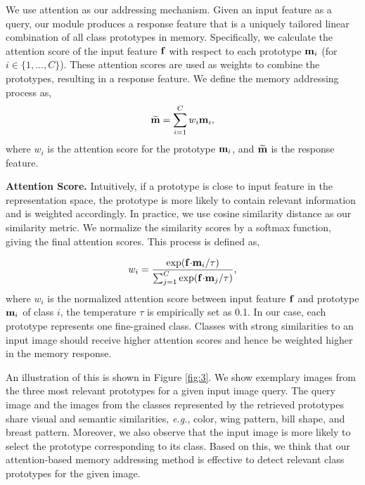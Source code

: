 \documentclass[journal]{IEEEtran}
\begin{document}
We use attention as our addressing mechanism. Given an input feature as a query, our module produces a response feature that is a uniquely tailored linear combination of all class prototypes in memory.  
Specifically, we calculate the attention score of the input feature $\bf f$ with respect to each prototype ${\bf m}_{i}$ (for $i \in \{1, \ldots, C\}$). These attention scores are used as weights to combine the prototypes, resulting in a response feature.
We define the memory addressing process as, 
\begin{equation}
   \widetilde{\bf m} = \sum_{i=1}^{C}w_{i}{\bf m}_{i},
    \label{combination}
\end{equation}
where $w_{i}$ is the attention score for the prototype ${\bf m}_{i}$, and $\widetilde{\bf m}$ is the response feature.

\textbf{Attention Score.} Intuitively, if a prototype is close to input feature in the representation space, the prototype is more likely to contain relevant information and is weighted accordingly.
In practice, we use cosine similarity distance as our similarity metric. We normalize the similarity scores by a softmax function, giving the final attention scores. This process is defined as, 

\begin{equation}
    w_{i} =  \frac{\exp({\bf f}{\cdot}{\bf m}_{i} / \tau)}{\sum_{j=1}^{C}\exp({\bf f}{\cdot}{\bf m}_{j} / \tau)},
    \label{attention}
\end{equation}
where $w_{i}$ is the normalized attention score between input feature $\bf f$ and prototype ${\bf m}_{i}$ of class $i$, the temperature $\tau$ is empirically set as 0.1. In our case, each prototype represents one fine-grained class. Classes with strong similarities to an input image should receive higher attention scores and hence be weighted higher in the memory response.

An illustration of this is shown in Figure \ref{fig:3}. 
We show exemplary images from the three most relevant prototypes for a given input image query. 
The query image and the images from the classes represented by the retrieved prototypes share visual and semantic similarities, \emph{e.g.}, color, wing pattern, bill shape, and breast pattern. Moreover, we also observe that the input image is more likely to select the prototype corresponding to its class.
Based on this, we think that our attention-based memory addressing method is effective to detect relevant class prototypes for the given image.
\end{document}
